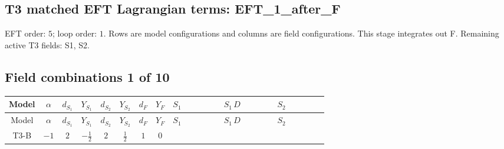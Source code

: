 \documentclass[8pt]{article}
\begin{document}
\begin{landscape}
\section*{T3 matched EFT Lagrangian terms: EFT\_1\_after\_F}
EFT order: $5$; loop order: $1$. 
Rows are model configurations and columns are field configurations. This stage integrates out F. Remaining active T3 fields: S1, S2.
\tiny
\subsection*{Field combinations 1 of 10}
\begin{longtable}{@{}cccccccc >{\raggedright\arraybackslash}p{0.21\linewidth} >{\raggedright\arraybackslash}p{0.21\linewidth} >{\raggedright\arraybackslash}p{0.21\linewidth}@{}}
\toprule
Model & $\alpha$ & $d_{S_1}$ & $Y_{S_1}$ & $d_{S_2}$ & $Y_{S_2}$ & $d_F$ & $Y_F$ & $S_1$ & $S_1\,D$ & $S_2$ \\
\midrule
\endfirsthead
\toprule
Model & $\alpha$ & $d_{S_1}$ & $Y_{S_1}$ & $d_{S_2}$ & $Y_{S_2}$ & $d_F$ & $Y_F$ & $S_1$ & $S_1\,D$ & $S_2$ \\
\midrule
\endhead
T3-B & $-1$ & $2$ & $-\frac{1}{2}$ & $2$ & $\frac{1}{2}$ & $1$ & $0$ & \scriptsize\adjustbox{max width=\linewidth}{$\begin{gathered} +C_{S_1^\dagger S_1} S_{1,j_1} S_{1,j_1}{}^{\dagger } \\ -\frac{1}{2} C_{S_1^\dagger S_1} \hbar  \overline{y_{1,i_1,r_1}} S_{1,j_1} y_{1,i_1,r_1} S_{1,j_1}{}^{\dagger } \\ -\frac{C_{S_1^\dagger S_1} \hbar  \overline{y_{1,i_1,r_1}} S_{1,j_1} y_{1,i_1,r_1} S_{1,j_1}{}^{\dagger }}{\epsilon }\end{gathered}$} & \scriptsize\adjustbox{max width=\linewidth}{$\begin{gathered} +D_{\mu _1}\left(S_{1,j_1}\right){}^{\dagger } D_{\mu _1}\left(S_{1,j_1}\right)\end{gathered}$} & \scriptsize\adjustbox{max width=\linewidth}{$\begin{gathered} +C_{S_2^\dagger S_2} S_{2,j_1} S_{2,j_1}{}^{\dagger } \\ -\frac{1}{2} C_{S_2^\dagger S_2} \hbar  \overline{y_{2,i_1,r_1}} S_{2,j_1} y_{2,i_1,r_1} S_{2,j_1}{}^{\dagger } \\ -\frac{C_{S_2^\dagger S_2} \hbar  \overline{y_{2,i_1,r_1}} S_{2,j_1} y_{2,i_1,r_1} S_{2,j_1}{}^{\dagger }}{\epsilon }\end{gathered}$} \\

\end{longtable}
\end{landscape}
\end{document}
